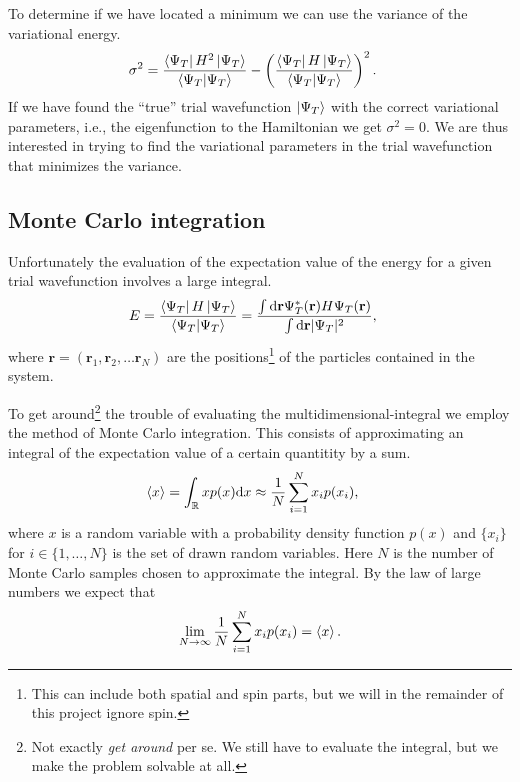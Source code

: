 \documentclass[
    a4paper, aps, twocolumn, floatfix, superscriptaddress,
    nofootinbib]{revtex4-1}
\newcommand{\vf}{\mathbf}
\newcommand{\1}{\mathds{1}}
\newcommand{\para}[1]{\left(#1\right)}
\begin{document}
    To determine if we have located a minimum we can use the variance of the
    variational energy.
    \begin{align}
        \sigma^2
        &=
        \frac{
            \bra{\Psi_T}H^2\ket{\Psi_T}
        }{
            \bra{\Psi_T}\ket{\Psi_T}
        }
        - \para{
            \frac{
                \bra{\Psi_T}H\ket{\Psi_T}
            }{
                \bra{\Psi_T}\ket{\Psi_T}
            }
        }^2.
    \end{align}
    If we have found the ``true'' trial wavefunction $\ket{\Psi_T}$ with the
    correct variational parameters, i.e., the eigenfunction to the Hamiltonian
    we get $\sigma^2 = 0$. We are thus interested in trying to find the
    variational parameters in the trial wavefunction that minimizes the
    variance.

    \subsection{Monte Carlo integration}
        Unfortunately the evaluation of the expectation value of the energy for
        a given trial wavefunction involves a large integral.
        \begin{align}
            E
            &= \frac{\bra{\Psi_T}H\ket{\Psi_T}}{\bra{\Psi_T}\ket{\Psi_T}}
            =
            \frac{\int\dd\vf{r}\Psi_T^{*}(\vf{r})H\Psi_T(\vf{r})}
            {\int\dd\vf{r}|\Psi_T|^2},
        \end{align}
        where $\vf{r} = (\vf{r}_1, \vf{r}_2, \dots \vf{r}_N)$ are the
        positions\footnote{This can include both spatial and spin parts, but we
        will in the remainder of this project ignore spin.} of the particles
        contained in the system.

        To get around\footnote{Not exactly \emph{get around} per se. We still
        have to evaluate the integral, but we make the problem solvable at all.}
        the trouble of evaluating the multidimensional-integral we employ the
        method of Monte Carlo integration. This consists of approximating an
        integral of the expectation value of a certain quantitity by a sum.
        \begin{align}
            \expval{x}
            &=
            \int_{\mathbb{R}}xp(x)\dd x
            \approx
            \frac{1}{N}\sum_{i = 1}^N x_ip(x_i),
        \end{align}
        where $x$ is a random variable with a probability density function
        $p(x)$ and $\{x_i\}$ for $i \in \{1, \dots, N\}$ is the set of drawn
        random variables. Here $N$ is the number of Monte Carlo samples chosen
        to approximate the integral. By the law of large numbers we expect that
        \begin{align}
            \lim_{N \to \infty}\frac{1}{N}\sum_{i = 1}^N x_ip(x_i)
            = \expval{x}.
        \end{align}
\end{document}
